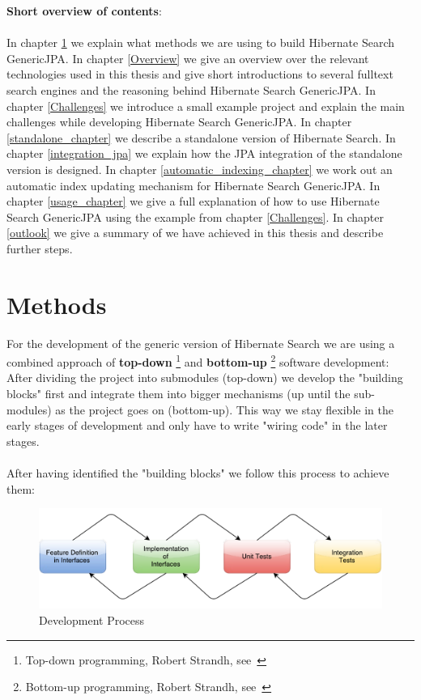 \pagebreak

\noindent
\textbf{Short overview of contents}:
\\\\
\noindent
In chapter \ref{Methods} we explain what methods we are using to build Hibernate Search GenericJPA. In chapter \ref{Overview} we give an overview over the relevant technologies used in this thesis and give short introductions to several fulltext search engines and the reasoning behind Hibernate Search GenericJPA. In chapter \ref{Challenges} we introduce a small example project and explain the main challenges while developing Hibernate Search GenericJPA. In chapter \ref{standalone_chapter} we describe a standalone version of Hibernate Search. In chapter \ref{integration_jpa} we explain how the JPA integration of the standalone version is designed. In chapter \ref{automatic_indexing_chapter} we work out an automatic index updating mechanism for Hibernate Search GenericJPA. In chapter \ref{usage_chapter} we give a full explanation of how to use Hibernate Search GenericJPA using the example from chapter \ref{Challenges}. In chapter \ref{outlook} we give a summary of we have achieved in this thesis and describe further steps.

\pagebreak

\pagebreak

\section{Methods} \label{Methods}

For the development of the generic version of Hibernate Search we are using a combined approach of \textbf{top-down} \footnote{Top-down programming, Robert Strandh, see~\cite{top_down_strandh}} and \textbf{bottom-up} \footnote{Bottom-up programming, Robert Strandh, see~\cite{bottom_up_strandh}} software development: After dividing the project into submodules (top-down) we develop the "building blocks"  first and integrate them into bigger mechanisms (up until the sub-modules) as the project goes on (bottom-up). This way we stay flexible in the early stages of development and only have to write "wiring code" in the later stages.
\\\\
After having identified the "building blocks" we follow this process to achieve them:

\begin{figure}[ht]
	\centering
	\includegraphics[scale=0.52]{images/work_process.pdf}
	\caption{Development Process}
	\label{development_process_of_a_feature}
\end{figure}

